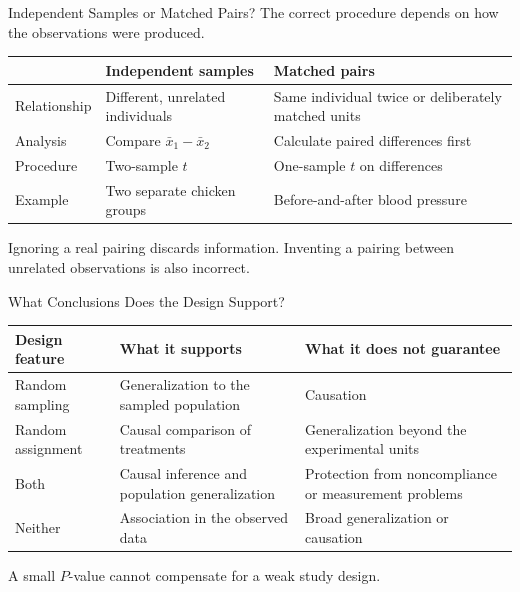 \documentclass[aspectratio=169,10pt]{beamer}
\begin{document}
\begin{frame}{Independent Samples or Matched Pairs?}
The correct procedure depends on how the observations were produced.

\begin{center}
\begin{tabularx}{0.94\textwidth}{>{\RaggedRight\arraybackslash}p{} X X}
\toprule
 & \textbf{Independent samples} & \textbf{Matched pairs} \\
\midrule
Relationship & Different, unrelated individuals & Same individual twice or deliberately matched units \\
Analysis & Compare $\bar{x}_1-\bar{x}_2$ & Calculate paired differences first \\
Procedure & Two-sample $t$ & One-sample $t$ on differences \\
Example & Two separate chicken groups & Before-and-after blood pressure \\
\bottomrule
\end{tabularx}
\end{center}

Ignoring a real pairing discards information. Inventing a pairing between unrelated observations is also incorrect.
\end{frame}

\begin{frame}{What Conclusions Does the Design Support?}
\begin{center}
\begin{tabularx}{0.95\textwidth}{>{\RaggedRight\arraybackslash}p{} X X}
\toprule
\textbf{Design feature} & \textbf{What it supports} & \textbf{What it does not guarantee} \\
\midrule
Random sampling & Generalization to the sampled population & Causation \\
Random assignment & Causal comparison of treatments & Generalization beyond the experimental units \\
Both & Causal inference and population generalization & Protection from noncompliance or measurement problems \\
Neither & Association in the observed data & Broad generalization or causation \\
\bottomrule
\end{tabularx}
\end{center}

A small $P$-value cannot compensate for a weak study design.
\end{frame}
\end{document}
